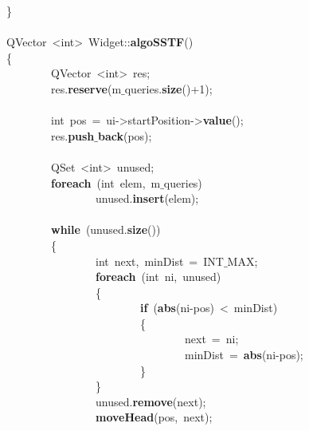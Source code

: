 \mbox{}\} \\
\mbox{} \\
\mbox{}QVector\ \textless{}int\textgreater{}\ Widget::\textbf{algoSSTF}() \\
\mbox{}\{ \\
\mbox{}\ \ \ \ \ \ \ \ QVector\ \textless{}int\textgreater{}\ res; \\
\mbox{}\ \ \ \ \ \ \ \ res.\textbf{reserve}(m$\_$queries.\textbf{size}()+1); \\
\mbox{} \\
\mbox{}\ \ \ \ \ \ \ \ int\ pos\ =\ ui-\textgreater{}startPosition-\textgreater{}\textbf{value}(); \\
\mbox{}\ \ \ \ \ \ \ \ res.\textbf{push$\_$back}(pos); \\
\mbox{} \\
\mbox{}\ \ \ \ \ \ \ \ QSet\ \textless{}int\textgreater{}\ unused; \\
\mbox{}\ \ \ \ \ \ \ \ \textbf{foreach}\ (int\ elem,\ m$\_$queries) \\
\mbox{}\ \ \ \ \ \ \ \ \ \ \ \ \ \ \ \ unused.\textbf{insert}(elem); \\
\mbox{} \\
\mbox{}\ \ \ \ \ \ \ \ \textbf{while}\ (unused.\textbf{size}()) \\
\mbox{}\ \ \ \ \ \ \ \ \{ \\
\mbox{}\ \ \ \ \ \ \ \ \ \ \ \ \ \ \ \ int\ next,\ minDist\ =\ INT$\_$MAX; \\
\mbox{}\ \ \ \ \ \ \ \ \ \ \ \ \ \ \ \ \textbf{foreach}\ (int\ ni,\ unused) \\
\mbox{}\ \ \ \ \ \ \ \ \ \ \ \ \ \ \ \ \{ \\
\mbox{}\ \ \ \ \ \ \ \ \ \ \ \ \ \ \ \ \ \ \ \ \ \ \ \ \textbf{if}\ (\textbf{abs}(ni-pos)\ \textless{}\ minDist) \\
\mbox{}\ \ \ \ \ \ \ \ \ \ \ \ \ \ \ \ \ \ \ \ \ \ \ \ \{ \\
\mbox{}\ \ \ \ \ \ \ \ \ \ \ \ \ \ \ \ \ \ \ \ \ \ \ \ \ \ \ \ \ \ \ \ next\ =\ ni; \\
\mbox{}\ \ \ \ \ \ \ \ \ \ \ \ \ \ \ \ \ \ \ \ \ \ \ \ \ \ \ \ \ \ \ \ minDist\ =\ \textbf{abs}(ni-pos); \\
\mbox{}\ \ \ \ \ \ \ \ \ \ \ \ \ \ \ \ \ \ \ \ \ \ \ \ \} \\
\mbox{}\ \ \ \ \ \ \ \ \ \ \ \ \ \ \ \ \} \\
\mbox{}\ \ \ \ \ \ \ \ \ \ \ \ \ \ \ \ unused.\textbf{remove}(next); \\
\mbox{}\ \ \ \ \ \ \ \ \ \ \ \ \ \ \ \ \textbf{moveHead}(pos,\ next); \\
